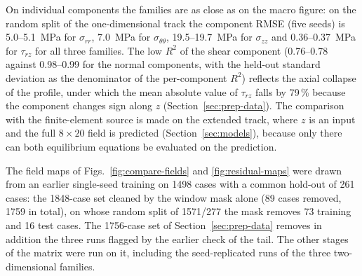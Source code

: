 \documentclass[pdflatex,sn-basic,Numbered]{sn-jnl}
\begin{document}
On individual components the families are as close as on the macro figure: on the random split of the one-dimensional track the component RMSE (five seeds) is 5.0--5.1~MPa for $\sigma_{rr}$, 7.0~MPa for $\sigma_{\theta\theta}$, 19.5--19.7~MPa for $\sigma_{zz}$ and 0.36--0.37~MPa for $\tau_{rz}$ for all three families. The low $R^2$ of the shear component (0.76--0.78 against 0.98--0.99 for the normal components, with the held-out standard deviation as the denominator of the per-component $R^2$) reflects
the axial collapse of the profile, under which the mean absolute value of $\tau_{rz}$ falls by 79\,\% because the component changes sign along $z$ (Section~\ref{sec:prep-data}). The comparison with the finite-element source is made on the extended track, where $z$ is an input and the full $8\times20$ field is predicted (Section~\ref{sec:models}), because only there can both equilibrium equations be evaluated on the prediction.

The field maps of Figs.~\ref{fig:compare-fields} and \ref{fig:residual-maps} were drawn from an earlier single-seed training on 1498 cases with a common hold-out of 261 cases: the 1848-case set cleaned by the window mask alone (89 cases removed, 1759 in total), on whose random split of 1571/277 the mask removes 73 training and 16 test cases.
The 1756-case set of Section~\ref{sec:prep-data} removes in addition the three runs flagged by the earlier check of the tail. The other stages of the matrix were run on it, including the seed-replicated runs of the three two-dimensional families.
\end{document}
